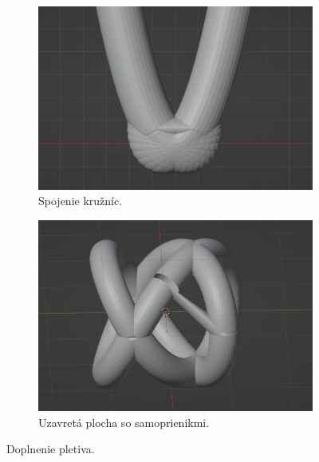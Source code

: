 \begin{figure}[h]
    \centering
    \begin{subfigure}[b]{0.6\textwidth}
        \centering
        \includegraphics[width=\textwidth]{images/mesh.png}
		\caption[Spojenie kružníc.]{Spojenie kružníc.}
        \label{fig:spojenie_kruznic_1}
    \end{subfigure}
    \hfill
    \begin{subfigure}[b]{0.6\textwidth}
        \centering
        \includegraphics[width=\textwidth]{images/diery.png}
        	\caption[Uzavretá plocha so samoprienikmi.]{Uzavretá plocha so samoprienikmi.}
        \label{fig:spojenie_kruznic_2}
    \end{subfigure}
    	\caption[Doplnenie pletiva.]{Doplnenie pletiva.}
    \label{fig:spojenie_kruznic}
\end{figure}

